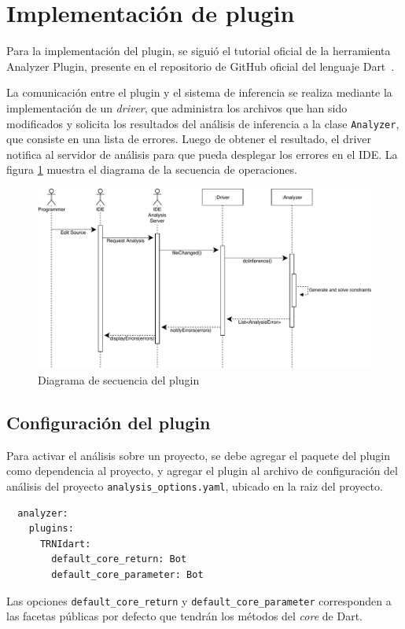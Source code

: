 \section{Implementación de plugin}
Para la implementación del plugin, se siguió el tutorial oficial de la herramienta Analyzer Plugin, presente en el repositorio de GitHub oficial del lenguaje Dart~\cite{plugin}.

La comunicación entre el plugin y el sistema de inferencia se realiza mediante la implementación de un \emph{driver}, que administra los archivos que han sido modificados y solicita los resultados del análisis de inferencia a la clase \texttt{Analyzer}, que consiste en una lista de errores. Luego de obtener el resultado, el driver notifica al servidor de análisis para que pueda desplegar los errores en el IDE. La figura \ref{seq} muestra el diagrama de la secuencia de operaciones.

\begin{figure}[ht]
  \centering
  \includegraphics[width=\textwidth]{imagenes/sequence.pdf}
  \caption{Diagrama de secuencia del plugin}
  \label{seq}
\end{figure}

\subsection{Configuración del plugin}
Para activar el análisis sobre un proyecto, se debe agregar el paquete del plugin como dependencia al proyecto, y agregar el plugin al archivo de configuración del análisis del proyecto \texttt{analysis\_options.yaml}, ubicado en la raiz del proyecto.

\begin{verbatim}
  analyzer:
    plugins:
      TRNIdart:
        default_core_return: Bot
        default_core_parameter: Bot
\end{verbatim}

Las opciones \texttt{default\_core\_return} y \texttt{default\_core\_parameter} corresponden a las facetas públicas por defecto que tendrán los métodos del \textit{core} de Dart.
